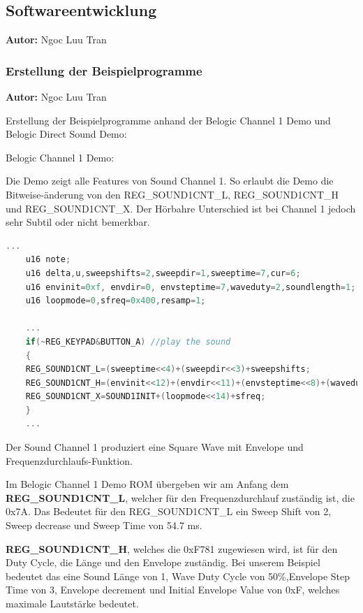 \documentclass[11pt,a4paper]{scrartcl}
\newcommand{\AutorNgoc} {
    \vspace{-4mm}
    \large \textbf{Autor:} Ngoc Luu Tran \normalsize
    \vspace{2mm}
}
\begin{document}

\subsection{Softwareentwicklung} \label{Softwareentwicklung}
\AutorNgoc

\subsubsection{Erstellung der Beispielprogramme}
\AutorNgoc

Erstellung der Beispielprogramme anhand der Belogic Channel 1 Demo und Belogic Direct Sound Demo:

Belogic Channel 1 Demo:

Die Demo zeigt alle Features von Sound Channel 1. So erlaubt die Demo die Bitweise-\"anderung von den REG\_SOUND1CNT\_L, REG\_SOUND1CNT\_H und REG\_SOUND1CNT\_X. Der H\"orbahre Unterschied ist bei Channel 1 jedoch sehr Subtil oder nicht bemerkbar.


\vspace{5mm}
\begin{lstlisting}[language=C++, caption={Belogic Channel 1 Demo}, label={list:channel1}]
	...
	u16 note;
	u16 delta,u,sweepshifts=2,sweepdir=1,sweeptime=7,cur=6;
	u16 envinit=0xf, envdir=0, envsteptime=7,waveduty=2,soundlength=1;
	u16 loopmode=0,sfreq=0x400,resamp=1;

    ...
	if(~REG_KEYPAD&BUTTON_A) //play the sound
	{ 
	REG_SOUND1CNT_L=(sweeptime<<4)+(sweepdir<<3)+sweepshifts;
	REG_SOUND1CNT_H=(envinit<<12)+(envdir<<11)+(envsteptime<<8)+(waveduty<<6)+soundlength;
	REG_SOUND1CNT_X=SOUND1INIT+(loopmode<<14)+sfreq;
	}
	...
\end{lstlisting}

Der Sound Channel 1 produziert eine Square Wave mit Envelope und Frequenzdurchlaufs-Funktion. 

Im Belogic Channel 1 Demo ROM \"ubergeben wir am Anfang dem \textbf{REG\_SOUND1CNT\_L}, welcher f\"ur den Frequenzdurchlauf zust\"andig ist, die 0x7A. Das Bedeutet f\"ur den REG\_SOUND1CNT\_L ein Sweep Shift von 2, Sweep decrease und Sweep Time von 54.7 ms.


\textbf{REG\_SOUND1CNT\_H}, welches die 0xF781 zugewiesen wird, ist f\"ur den Duty Cycle, die L\"ange und den Envelope zust\"andig. Bei unserem Beispiel bedeutet das eine Sound L\"ange von 1, Wave Duty Cycle von 50\%,Envelope Step Time von 3, Envelope decrement und Initial Envelope Value von 0xF, welches maximale Lautst\"arke bedeutet.
\end{document}
